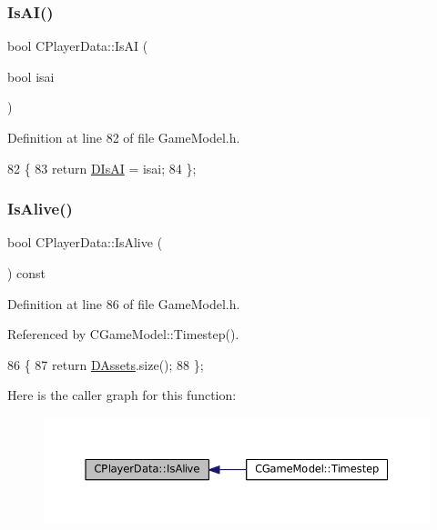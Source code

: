 \subsubsection{\texorpdfstring{Is\+A\+I()}{IsAI()}\hspace{0.1cm}{\footnotesize\ttfamily [2/2]}}
{\footnotesize\ttfamily bool C\+Player\+Data\+::\+Is\+AI (\begin{DoxyParamCaption}\item[{bool}]{isai }\end{DoxyParamCaption})\hspace{0.3cm}{\ttfamily [inline]}}



Definition at line 82 of file Game\+Model.\+h.


\begin{DoxyCode}
82                             \{
83             \textcolor{keywordflow}{return} \hyperlink{classCPlayerData_ad3fcb8740d4e37b4654c01c8c595e6d5}{DIsAI} = isai;
84         \};
\end{DoxyCode}
\hypertarget{classCPlayerData_a46ba3f00069e6da5cf4a1203a7456e1d}{}\label{classCPlayerData_a46ba3f00069e6da5cf4a1203a7456e1d} 
\subsubsection{\texorpdfstring{Is\+Alive()}{IsAlive()}}
{\footnotesize\ttfamily bool C\+Player\+Data\+::\+Is\+Alive (\begin{DoxyParamCaption}{ }\end{DoxyParamCaption}) const\hspace{0.3cm}{\ttfamily [inline]}}



Definition at line 86 of file Game\+Model.\+h.



Referenced by C\+Game\+Model\+::\+Timestep().


\begin{DoxyCode}
86                             \{
87             \textcolor{keywordflow}{return} \hyperlink{classCPlayerData_a1d7dd355facf52db6242e3554373906c}{DAssets}.size();
88         \};
\end{DoxyCode}
Here is the caller graph for this function\+:\nopagebreak
\begin{figure}[H]
\begin{center}
\leavevmode
\includegraphics[width=350pt]{classCPlayerData_a46ba3f00069e6da5cf4a1203a7456e1d_icgraph}
\end{center}
\end{figure}
\hypertarget{classCPlayerData_a73b2e6868bd85953604412904a20316a}{}\label{classCPlayerData_a73b2e6868bd85953604412904a20316a} 
